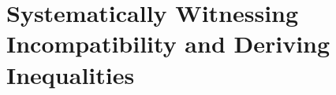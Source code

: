 {%


\section{Systematically Witnessing Incompatibility and Deriving Inequalities}
\label{sec:ineqs}


}
